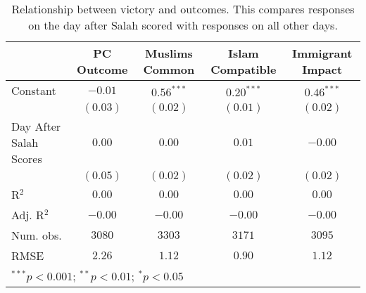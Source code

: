 
\begin{table}[H]
\begin{center}
\begin{footnotesize}
\begin{tabular}{l c c c c}
\hline
 & PC Outcome & Muslims Common & Islam Compatible & Immigrant Impact \\
\hline
Constant               & $-0.01$  & $0.56^{***}$ & $0.20^{***}$ & $0.46^{***}$ \\
                       & $(0.03)$ & $(0.02)$     & $(0.01)$     & $(0.02)$     \\
Day After
Salah Scores & $0.00$   & $0.00$       & $0.01$       & $-0.00$      \\
                       & $(0.05)$ & $(0.02)$     & $(0.02)$     & $(0.02)$     \\
\hline
R$^2$                  & $0.00$   & $0.00$       & $0.00$       & $0.00$       \\
Adj. R$^2$             & $-0.00$  & $-0.00$      & $-0.00$      & $-0.00$      \\
Num. obs.              & $3080$   & $3303$       & $3171$       & $3095$       \\
RMSE                   & $2.26$   & $1.12$       & $0.90$       & $1.12$       \\
\hline
\multicolumn{5}{l}{\tiny{$^{***}p<0.001$; $^{**}p<0.01$; $^{*}p<0.05$}}
\end{tabular}
\end{footnotesize}
\caption{Relationship between victory and outcomes. This compares responses on the day after Salah scored 
       with responses on all other days.}
\label{tab:fb_scored2}
\end{center}
\end{table}
